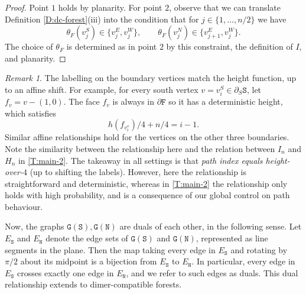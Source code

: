 \documentclass[11pt,twoside]{amsart}
\theoremstyle{plain}
\numberwithin{quest}{section}
\theoremstyle{remark}
\newtheorem{rem}{Remark}
\numberwithin{rem}{section}
\theoremstyle{definition}
\renewcommand{\tt}[1]{{\mathtt{#1}}}
\begin{document}
	\begin{proof}
		Point $1$ holds by planarity. For point $2$, observe that we can translate Definition \ref{D:dc-forest}(iii) into the condition that for $j \in \{1, \dots, n/2\}$ we have
		$$
		\theta_F(v^S_j) \in \{v_j^E, v^W_j\}, \qquad \theta_F(v^N_j) \in \{v_{j+1}^E, v^W_j\}.
		$$ 
		The choice of $\theta_F$ is determined as in point $2$ by this constraint, the definition of $I$, and planarity.
	\end{proof}
	
	\begin{rem}
		\label{R:labelling}
		The labelling on the boundary vertices match the height function, up to an affine shift. For example, for every south vertex $v = v^S_i \in \partial_S \tt{S}$, let $f_v = v - (1, 0)$. The face $f_v$ is always in $\partial \tt{F}$ so it has a deterministic height, which satisfies
		$$
		h(f_{v_i^{*}})/4 + n/4 = i - 1.
		$$
		Similar affine relationships hold for the vertices on the other three boundaries. Note the similarity between the relationship here and the relation between $I_n$ and $H_n$ in \cref{T:main-2}. The takeaway in all settings is that \textit{path index equals height-over-$4$} (up to shifting the labels). However, here the relationship is straightforward and deterministic, whereas in \cref{T:main-2} the relationship only holds with high probability, and is a consequence of our global control on path behaviour. 
	\end{rem}
	
	
	
	
	Now, the graphs $\tt{G}(\tt{S}), \tt{G}(\tt{N})$ are duals of each other, in the following sense. Let $E_\tt{S}$ and $E_\tt{N}$ denote the edge sets of $\tt{G}(\tt{S})$ and $\tt{G}(\tt{N})$, represented as line segments in the plane. Then the map taking every edge in $E_\tt{S}$ and rotating by $\pi/2$ about its midpoint is a bijection from $E_\tt{S}$ to $E_\tt{N}$.  
	In particular, every edge in $E_\tt{S}$ crosses exactly one edge in $E_\tt{N}$, and we refer to such edges as duals.
	This dual relationship extends to dimer-compatible forests. 
	
\end{document}
